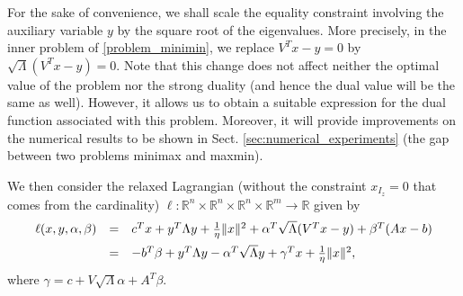 \documentclass[smallextended,referee,envcountsect]{svjour3}
\newcommand{\R}{\mathbb{R}}
\begin{document}
For the sake of convenience, we shall scale the equality constraint involving 
the auxiliary variable $y$ by the square root of the eigenvalues. More precisely, in the 
inner problem of \eqref{problem_minimin}, we replace $V^Tx-y = 0$ by 
$\sqrt{\Lambda}(V^Tx-y) = 0$. Note that this change does not affect neither the optimal 
value of the problem nor the strong duality (and hence the dual value will be the same 
as well). However, it allows us to obtain a suitable expression for the dual function 
associated with this problem. Moreover, it will provide improvements on the numerical 
results to be shown in Sect. \ref{sec:numerical_experiments} (the gap between two problems 
minimax and maxmin).

We then consider the relaxed Lagrangian (without the constraint $x_{I_z}=0$ 
that comes from the cardinality) $\ell:\R^n\times\R^n\times\R^n\times\R^m\to\R$ given by 
$$
\begin{array}{ccl}
\ell(x,y,\alpha,\beta) & = & 
c^Tx+y^T\Lambda y+\textstyle\frac{1}{\eta}\|x\|^2+\alpha^T\sqrt{\Lambda}(V^Tx-y)+
\beta^T(Ax-b) \vspace{5pt} \\ 
& = & 
-b^T\beta+y^T\Lambda{y}-\alpha^T\sqrt{\Lambda}y+\gamma^Tx+\frac{1}{\eta}\|x\|^2,
\end{array}
$$
where $\gamma=c+V\sqrt{\Lambda}\alpha+A^T\beta$. 
\end{document}

